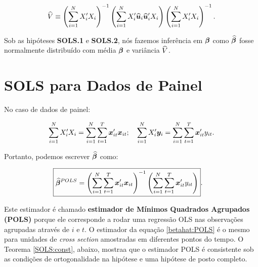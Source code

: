 \documentclass[11pt, oneside, a4paper, article]{article}
\numberwithin{equation}{section}
\begin{document}
\vspace{-1 em}
\begin{align*}
\widehat{V} \equiv 
\left( \sum_{i=1}^{N} X_{i}' X_{i}  \right)^{-1}
\left( \sum_{i=1}^{N} X_{i}' \widehat{\boldsymbol{u}}_{i} \widehat{\boldsymbol{u}}_{i}'  X_{i}  \right)
\left( \sum_{i=1}^{N} X_{i}' X_{i}  \right)^{-1}.
\end{align*}

Sob as hipóteses \textbf{SOLS.1} e \textbf{SOLS.2}, nós fazemos inferência em $\boldsymbol{\beta}$ como $\widehat{\boldsymbol{\beta}}$ fosse normalmente distribuído com média $\boldsymbol{\beta}$ e variância $\widehat{V}$.


\clearpage
\section{SOLS para Dados de Painel}
\noindent
\citet[Sec.7.8 -- The Linear Panel Data Model, Revisited. p.169]{wool-2010} 

No caso de dados de painel:

\vspace{-1 em}
\begin{align*}
\sum_{i=1}^{N} X_{i}' X_{i}
=
\sum_{i=1}^{N} \sum_{t=1}^{T} \boldsymbol{x}_{it}' \boldsymbol{x}_{it};
\quad
\sum_{i=1}^{N} X_{i}' \boldsymbol{y}_{i}
=
\sum_{i=1}^{N} \sum_{t=1}^{T} \boldsymbol{x}_{it}' y_{it}.
\end{align*}

Portanto, podemos escrever $\widehat{\boldsymbol{\beta}}$ como:

\vspace{-1 em}
\begin{align} \label{betahat:POLS}
\Aboxed{
\betahatbold^{POLS} =
\left( \sum_{i=1}^{N} \sum_{t=1}^{T} \mbs{x}_{it}' \mbs{x}_{it} \right)^{-1}
\left( \sum_{i=1}^{N} \sum_{t=1}^{T} \mbs{x}_{it}' y_{it} \right)
}.
\end{align}

Este estimador é chamado \textbf{estimador de Mínimos Quadrados Agrupados (POLS)} porque ele corresponde a rodar uma regressão OLS nas observações agrupadas através de $i$ e $t$. 
O estimador da equação \eqref{betahat:POLS} é o mesmo para unidades de \textit{cross section} amostradas em diferentes pontos do tempo.
O Teorema \ref{SOLS:const}, abaixo, mostraa que o estimador POLS é consistente sob as condições de ortogonalidade na hipótese  e uma hipótese de posto completo.
\end{document}
